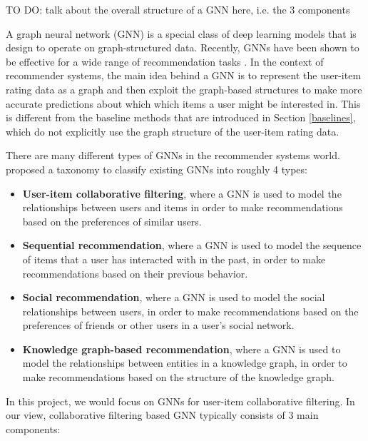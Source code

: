 \documentclass{article}
\begin{document}
TO DO: talk about the overall structure of a GNN here, i.e. the 3 components

A graph neural network (GNN) is a special class of deep learning models that is design to operate on graph-structured data. Recently, GNNs have been shown to be effective for a wide range of recommendation tasks \cite{survey}. In the context of recommender systems, the main idea behind a GNN is to represent the user-item rating data as a graph and then exploit the graph-based structures to make more accurate predictions about which which items a user might be interested in. This is different from the baseline methods that are introduced in Section \ref{baselines}, which do not explicitly use the graph structure of the user-item rating data.

There are many different types of GNNs in the recommender systems world. \cite{survey} proposed a taxonomy to classify existing GNNs into roughly 4 types:

\begin{itemize}
    \item \textbf{User-item collaborative filtering}, where a GNN is used to model the relationships between users and items in order to make recommendations based on the preferences of similar users.
    \item \textbf{Sequential recommendation}, where a GNN is used to model the sequence of items that a user has interacted with in the past, in order to make recommendations based on their previous behavior.
    \item \textbf{Social recommendation}, where a GNN is used to model the social relationships between users, in order to make recommendations based on the preferences of friends or other users in a user's social network.
    \item \textbf{Knowledge graph-based recommendation}, where a GNN is used to model the relationships between entities in a knowledge graph, in order to make recommendations based on the structure of the knowledge graph.
\end{itemize}

In this project, we would focus on GNNs for user-item collaborative filtering. In our view, collaborative filtering based GNN typically consists of 3 main components:
\end{document}

